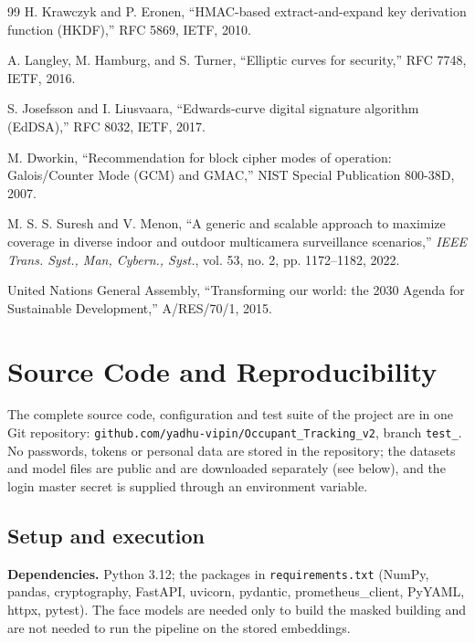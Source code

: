 \documentclass[12pt,a4paper,oneside]{report}
\begin{document}
\begin{thebibliography}{99}
H. Krawczyk and P. Eronen,
``HMAC-based extract-and-expand key derivation function (HKDF),''
RFC 5869, IETF, 2010.

A. Langley, M. Hamburg, and S. Turner,
``Elliptic curves for security,''
RFC 7748, IETF, 2016.

S. Josefsson and I. Liusvaara,
``Edwards-curve digital signature algorithm (EdDSA),''
RFC 8032, IETF, 2017.

M. Dworkin,
``Recommendation for block cipher modes of operation: Galois/Counter Mode (GCM) and GMAC,''
NIST Special Publication 800-38D, 2007.

M. S. S. Suresh and V. Menon,
``A generic and scalable approach to maximize coverage in diverse indoor and outdoor multicamera surveillance scenarios,''
\textit{IEEE Trans. Syst., Man, Cybern., Syst.},
vol. 53, no. 2, pp. 1172--1182,
2022.

United Nations General Assembly,
``Transforming our world: the 2030 Agenda for Sustainable Development,''
A/RES/70/1, 2015.

\end{thebibliography}
\clearpage
\appendix\chapter{Source Code and Reproducibility}
The complete source code, configuration and test suite of the project are in one Git repository: \texttt{github.com/yadhu-vipin/Occupant\_\allowbreak Tracking\_\allowbreak v2}, branch \texttt{test\_}. No passwords, tokens or personal data are stored in the repository; the datasets and model files are public and are downloaded separately (see below), and the login master secret is supplied through an environment variable.

\section{Setup and execution}\label{app:setup}
\textbf{Dependencies.} Python 3.12; the packages in \texttt{requirements.txt} (NumPy, pandas, cryptography, FastAPI, uvicorn, pydantic, prometheus\_\allowbreak client, PyYAML, httpx, pytest). The face models are needed only to build the masked building and are not needed to run the pipeline on the stored embeddings.
\end{document}
